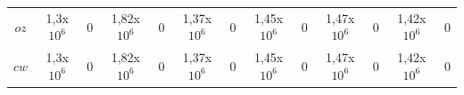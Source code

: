 \begin{table}[H]
\begin{center}
\begin{adjustbox}{max width=\textwidth}
\begin{tabular}{ccccccccccccc}
\multicolumn{1}{c}{$oz$}   & \multicolumn{1}{c}{1,3x$10^{6}$} & \multicolumn{1}{c}{0} & \multicolumn{1}{c}{1,82x$10^{6}$} & \multicolumn{1}{c}{0} & \multicolumn{1}{c}{1,37x$10^{6}$} & \multicolumn{1}{c}{0} & \multicolumn{1}{c}{1,45x$10^{6}$} & \multicolumn{1}{c}{0} & \multicolumn{1}{c}{1,47x$10^{6}$} & \multicolumn{1}{c}{0} & \multicolumn{1}{c}{1,42x$10^{6}$} & \multicolumn{1}{c}{0} \\ 
\multicolumn{1}{c}{$cw$}   & \multicolumn{1}{c}{1,3x$10^{6}$} & \multicolumn{1}{c}{0} & \multicolumn{1}{c}{1,82x$10^{6}$} & \multicolumn{1}{c}{0} & \multicolumn{1}{c}{1,37x$10^{6}$} & \multicolumn{1}{c}{0} & \multicolumn{1}{c}{1,45x$10^{6}$} & \multicolumn{1}{c}{0} & \multicolumn{1}{c}{1,47x$10^{6}$} & \multicolumn{1}{c}{0} & \multicolumn{1}{c}{1,42x$10^{6}$} & \multicolumn{1}{c}{0} \\ 
\bottomrule
\end{tabular}
\end{adjustbox}
\end{center}
\label{tab:compvertmaxminB}
\end{table}


